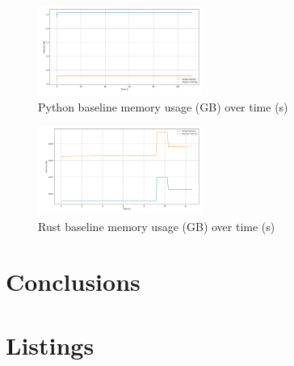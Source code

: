 \documentclass{article}
\begin{document}
\begin{multicols}{2}
\begin{figure}[H]
    \centering
    \includegraphics[width=0.48\textwidth]{figures/baseline_py.png}
    \caption{Python baseline memory usage (GB) over time (s)}
    \label{fig:baseline_py}
\end{figure}
\begin{figure}[H]
    \centering
    \includegraphics[width=0.48\textwidth]{figures/baseline_rs.png}
    \caption{Rust baseline memory usage (GB) over time (s)}
    \label{fig:baseline_rs}
\end{figure}

\section{Conclusions}
\end{multicols}
\section{Listings}








\end{document}
